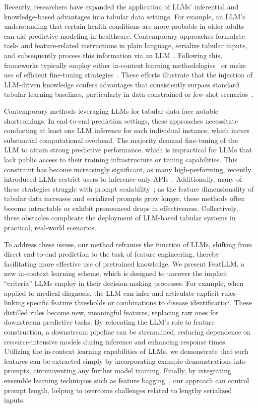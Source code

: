 Recently, researchers have expanded the application of LLMs' inferential and knowledge-based advantages into tabular data settings. For example, an LLM’s understanding that certain health conditions are more probable in older adults can aid predictive modeling in healthcare. Contemporary approaches formulate task- and feature-related instructions in plain language, serialize tabular inputs, and subsequently process this information via an LLM~\cite{dinh2022lift,wang2023anypredict}. Following this, frameworks typically employ either in-context learning methodologies~\cite{nam2023semi} or make use of efficient fine-tuning strategies~\cite{dinh2022lift,hegselmann2023tabllm}. These efforts illustrate that the injection of LLM-driven knowledge confers advantages that consistently surpass standard tabular learning baselines, particularly in data-constrained or few-shot scenarios~\cite{hegselmann2023tabllm}.

Contemporary methods leveraging LLMs for tabular data face notable shortcomings. In end-to-end prediction settings, these approaches necessitate conducting at least one LLM inference for each individual instance, which incurs substantial computational overhead. The majority demand fine-tuning of the LLM to attain strong predictive performance, which is impractical for LLMs that lack public access to their training infrastructure or tuning capabilities. This constraint has become increasingly significant, as many high-performing, recently introduced LLMs restrict users to inference-only APIs~\cite{anil2023palm,openai2023gpt4}. Additionally, many of these strategies struggle with prompt scalability~\cite{liu2023lost}; as the feature dimensionality of tabular data increases and serialized prompts grow longer, these methods often become intractable or exhibit pronounced drops in effectiveness. Collectively, these obstacles complicate the deployment of LLM-based tabular systems in practical, real-world scenarios.

To address these issues, our method reframes the function of LLMs, shifting from direct end-to-end prediction to the task of feature engineering, thereby facilitating more effective use of pretrained knowledge. We present \textsf{FeatLLM}, a new in-context learning scheme, which is designed to uncover the implicit ``criteria'' LLMs employ in their decision-making processes. For example, when applied to medical diagnosis, the LLM can infer and articulate explicit rules—linking specific feature thresholds or combinations to disease identification. These distilled rules become new, meaningful features, replacing raw ones for downstream predictive tasks. By relocating the LLM's role to feature construction, a downstream pipeline can be streamlined, reducing dependence on resource-intensive models during inference and enhancing response times. Utilizing the in-context learning capabilities of LLMs, we demonstrate that such features can be extracted simply by incorporating example demonstrations into prompts, circumventing any further model training. Finally, by integrating ensemble learning techniques such as feature bagging~\cite{breiman2001random}, our approach can control prompt length, helping to overcome challenges related to lengthy serialized inputs.

